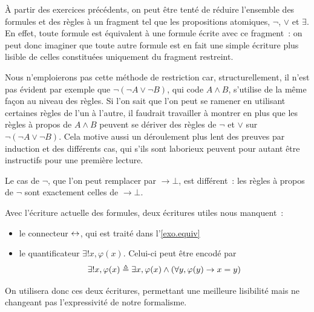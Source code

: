 \begin{remark}
  \`A partir des exercices précédents, on peut être tenté de réduire l'ensemble
  des formules et des règles à un fragment tel que les propositions atomiques,
  $\lnot$, $\lor$ et $\exists$. En effet, toute formule est équivalent à une
  formule écrite avec ce fragment~: on peut donc imaginer que toute autre
  formule est en fait une simple écriture plus lisible de celles constituées
  uniquement du fragment restreint.

  Nous n'emploierons pas cette méthode de restriction car, structurellement,
  il n'est pas évident par exemple que $\lnot (\lnot A \lor \lnot B)$, qui code
  $A \land B$, s'utilise de la même façon au niveau des règles. Si l'on sait que
  l'on peut se ramener en utilisant certaines règles de l'un à l'autre, il
  faudrait travailler à montrer en plus que les règles à propos de $A\land B$
  peuvent se dériver des règles de $\lnot$ et $\lor$ sur
  $\lnot (\lnot A \lor \lnot B)$. Cela motive aussi un déroulement plus
  lent des preuves par induction et des différents cas, qui s'ils sont
  laborieux peuvent pour autant être instructifs pour une première lecture.

  Le cas de $\lnot$, que l'on peut remplacer par $\to \bot$, est différent~:
  les règles à propos de $\lnot$ sont exactement celles de $\to \bot$.
\end{remark}

\begin{remark}
    Avec l'écriture actuelle des formules, deux écritures utiles nous
    manquent~:
    \begin{itemize}
        \item le connecteur $\mathrel{\leftrightarrow}$, qui est traité dans
        l'\cref{exo.equiv}
        \item le quantificateur $\exists ! x, \varphi(x)$. Celui-ci peut
        être encodé par
        \[\exists!x, \varphi(x) \triangleq \exists x, \varphi(x) \land
        (\forall y, \varphi(y) \to x = y)\]
    \end{itemize}
    On utilisera donc ces deux écritures, permettant une meilleure lisibilité
    mais ne changeant pas l'expressivité de notre formalisme.
\end{remark}

